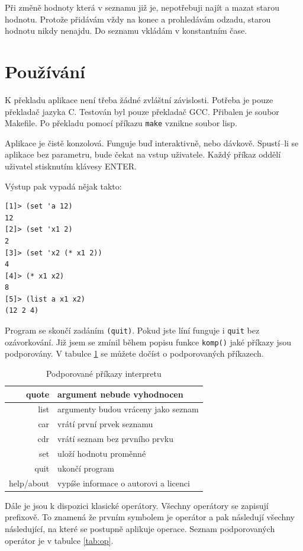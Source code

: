 \documentclass[a4paper, 12pt]{article}
\begin{document}
Při změně hodnoty která v seznamu již je, nepotřebuji najít a mazat
starou hodnotu. Protože přidávám vždy na konec a prohledávám odzadu,
starou hodnotu nikdy nenajdu. Do seznamu vkládám v konstantním čase.

\section{Používání}
K překladu aplikace není třeba žádné zvláštní závislosti. Potřeba je
pouze překladač jazyka C. Testován byl pouze překladač \textsf{GCC}.
Přibalen je soubor \textsf{Makefile}. Po překladu pomocí příkazu
\texttt{make} vznikne soubor \textsf{lisp}.

Aplikace je čistě konzolová. Funguje buď interaktivně, nebo
dávkově. Spustí--li se aplikace bez parametru, bude čekat na vstup
uživatele. Každý příkaz oddělí uživatel stisknutím klávesy ENTER.

Výstup pak vypadá nějak takto:
\begin{verbatim}
[1]> (set 'a 12)
12
[2]> (set 'x1 2)
2
[3]> (set 'x2 (* x1 2))
4
[4]> (* x1 x2)
8
[5]> (list a x1 x2)
(12 2 4)
\end{verbatim}

Program se skončí zadáním \texttt{(quit)}. Pokud jste líní funguje i
\texttt{quit} bez ozávorkování. Již jsem se zmínil během popisu funkce
\texttt{komp()} jaké příkazy jsou podporovány. V tabulce \ref{tab:prik}
se můžete dočíst o podporovaných příkazech.

\begin{table}
\centering
\begin{tabular}{|r|l|}
\hline
quote & argument nebude vyhodnocen\\ \hline
list & argumenty budou vráceny jako seznam\\ \hline
car & vrátí první prvek seznamu\\ \hline
cdr & vrátí seznam bez prvního prvku\\ \hline
set & uloží hodnotu proměnné\\ \hline
quit & ukončí program\\ \hline
help/about & vypíše informace o autorovi a licenci\\
\hline
\end{tabular}
\caption{Podporované příkazy interpretu}
\label{tab:prik}
\end{table}

Dále je jsou k dispozici klasické operátory. Všechny operátory se
zapisují prefixově. To znamená že prvním symbolem je operátor a pak
následují všechny následující, na které se postupně aplikuje operace.
Seznam podporovaných operátor je v tabulce \ref{tab:op}.
\end{document}
